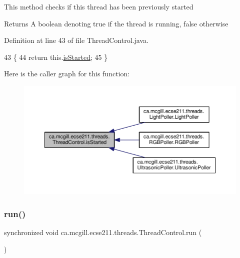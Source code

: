 This method checks if this thread has been previously started

\begin{DoxyReturn}{Returns}
A boolean denoting true if the thread is running, false otherwise 
\end{DoxyReturn}


Definition at line 43 of file Thread\+Control.\+java.


\begin{DoxyCode}
43                                           \{
44     \textcolor{keywordflow}{return} this.\hyperlink{classca_1_1mcgill_1_1ecse211_1_1threads_1_1_thread_control_a92f4933511db42476e39956246bcf2fe}{isStarted};
45   \}
\end{DoxyCode}
Here is the caller graph for this function\+:\nopagebreak
\begin{figure}[H]
\begin{center}
\leavevmode
\includegraphics[width=350pt]{classca_1_1mcgill_1_1ecse211_1_1threads_1_1_thread_control_a92f4933511db42476e39956246bcf2fe_icgraph}
\end{center}
\end{figure}
\mbox{\label{classca_1_1mcgill_1_1ecse211_1_1threads_1_1_thread_control_a03e743000ea2c37080427565e8ec5f35}} 
\subsubsection{\texorpdfstring{run()}{run()}}
{\footnotesize\ttfamily synchronized void ca.\+mcgill.\+ecse211.\+threads.\+Thread\+Control.\+run (\begin{DoxyParamCaption}{ }\end{DoxyParamCaption})}

